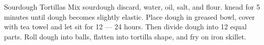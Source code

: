 \documentclass[../main.tex]{subfiles}
\begin{document}
\begin{recipe}{Sourdough Tortillas}{}{}
    Mix sourdough discard, water, oil, salt, and flour.
    knead for 5 minutes until dough becomes slightly elastic.
    Place dough in greased bowl, cover with tea towel and let
    sit for 12 --- 24 hours. Then divide dough into 12 equal parts.
    Roll dough into balls, flatten into tortilla shape, and fry on
    iron skillet.
\end{recipe}
\end{document}
